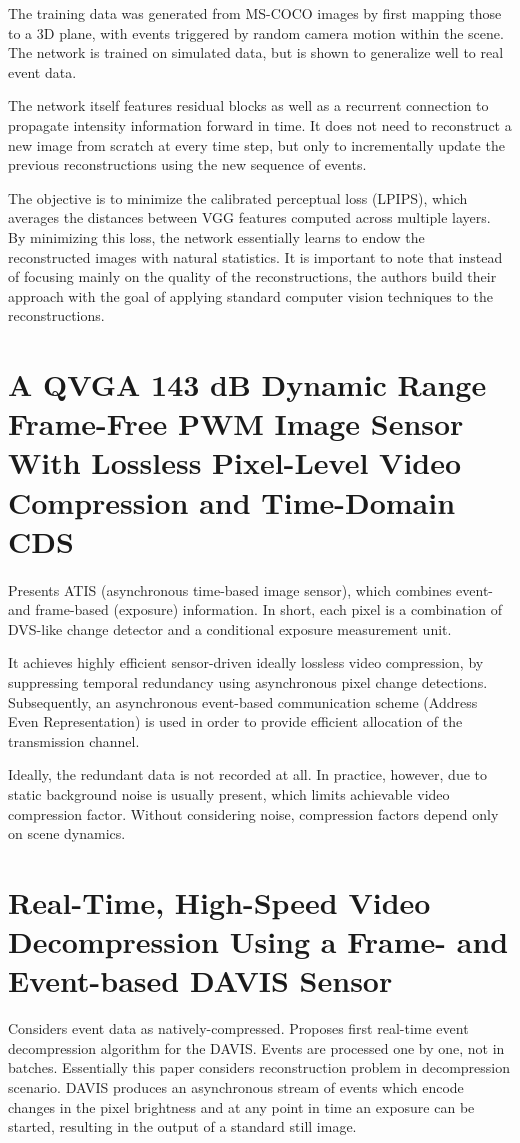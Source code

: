 \documentclass[10pt,a4paper]{article}
\begin{document}
The training data was generated from MS-COCO images by first mapping those to a 3D plane, with events triggered by random camera motion within the scene. The network is trained on simulated data, but is shown to generalize well to real event data.

The network itself features residual blocks as well as a recurrent connection to propagate intensity  information forward in time.
It does not need to reconstruct a new image from scratch at every time step, but only to incrementally update the previous reconstructions using the new sequence of events.

The objective is to minimize the calibrated perceptual loss (LPIPS), which averages the distances between VGG features computed across multiple layers. By minimizing this loss, the network essentially learns to endow the reconstructed images with natural statistics. It is important to note that instead of focusing mainly on the quality of the reconstructions, the authors build their approach with the goal of applying standard computer vision techniques to the reconstructions.

\section{A QVGA 143 dB Dynamic Range Frame-Free PWM Image Sensor With Lossless Pixel-Level Video Compression and Time-Domain CDS}
\paragraph{}
Presents ATIS (asynchronous time-based image sensor), which combines event- and frame-based (exposure) information.
In short, each pixel is a combination of DVS-like change detector and a conditional exposure measurement unit.

It achieves highly efficient sensor-driven ideally lossless video compression, by suppressing temporal redundancy using asynchronous pixel change detections.
Subsequently, an asynchronous event-based communication scheme (Address Even Representation) is used in order to provide efficient allocation of the transmission channel.

Ideally, the redundant data is not recorded at all. In practice, however, due to static background noise is usually present, which limits achievable video compression factor.
Without considering noise, compression factors depend only on scene dynamics.

\section{Real-Time, High-Speed Video Decompression Using a Frame- and Event-based DAVIS Sensor}
Considers event data as natively-compressed.
Proposes first real-time event decompression algorithm for the DAVIS.
Events are processed one by one, not in batches.
Essentially this paper considers reconstruction problem in decompression scenario.
DAVIS produces an asynchronous stream of events which encode changes in the pixel brightness and at any point in time an exposure can be started, resulting in the output of a standard still image.
\end{document}
